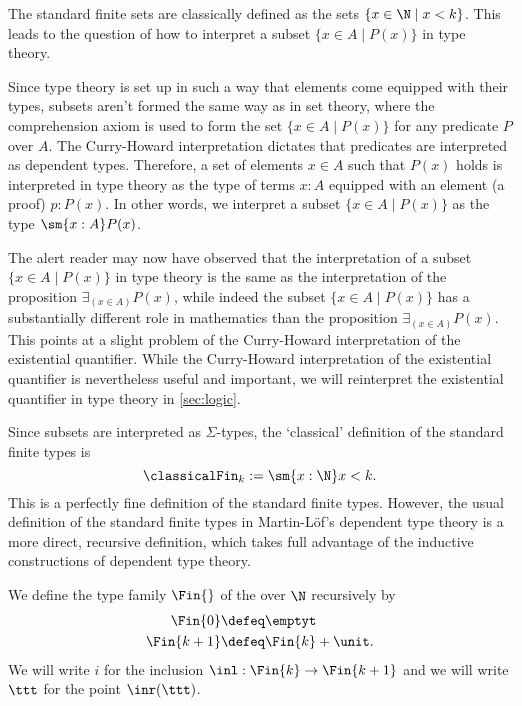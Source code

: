 The standard finite sets are classically defined as the sets $\{x\in\N\mid x<k\}$. This leads to the question of how to interpret a subset $\{x\in A\mid P(x)\}$ in type theory.

Since type theory is set up in such a way that elements come equipped with their types, subsets aren't formed the same way as in set theory, where the comprehension axiom is used to form the set $\{x\in A\mid P(x)\}$ for any predicate $P$ over $A$. The Curry-Howard interpretation dictates that predicates are interpreted as dependent types. Therefore, a set of elements $x\in A$ such that $P(x)$ holds is interpreted in type theory as the type of terms $x:A$ equipped with an element (a proof) $p:P(x)$. In other words, we interpret a subset $\{x\in A\mid P(x)\}$ as the type $\sm{x:A}P(x)$.

\begin{rmk}
  The alert reader may now have observed that the interpretation of a subset $\{x\in A\mid P(x)\}$ in type theory is the same as the interpretation of the proposition $\exists_{(x\in A)}P(x)$, while indeed the subset $\{x\in A\mid P(x)\}$ has a substantially different role in mathematics than the proposition $\exists_{(x\in A)}P(x)$. This points at a slight problem of the Curry-Howard interpretation of the existential quantifier. While the Curry-Howard interpretation of the existential quantifier is nevertheless useful and important, we will reinterpret the existential quantifier in type theory in \cref{sec:logic}.
\end{rmk}

Since subsets are interpreted as $\Sigma$-types, the `classical' definition of the standard finite types is
\begin{equation*}
  \classicalFin_k:=\sm{x:\N}x<k.
\end{equation*}
This is a perfectly fine definition of the standard finite types. However, the usual definition of the standard finite types in Martin-L\"of's dependent type theory is a more direct, recursive definition, which takes full advantage of the inductive constructions of dependent type theory. 

\begin{defn}\label{defn:fin}
  We define the type family $\Fin{}$ of the  over $\N$ recursively by
  \begin{align*}
    \Fin{0} & \defeq \emptyt \\*
    \Fin{k+1} & \defeq \Fin{k}+\unit.
  \end{align*}
  We will write $i$ for the inclusion $\inl:\Fin{k}\to\Fin{k+1}$ and we will write $\ttt$ for the point $\inr(\ttt)$.
\end{defn}


